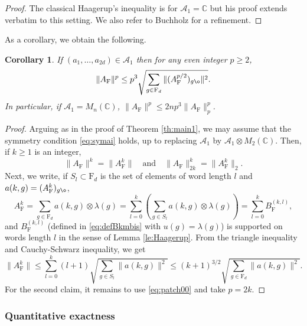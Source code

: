\documentclass[11pt]{article}
\renewcommand{\star}{{\mathrm{F}}}
\newtheorem{corollary}[lemma]{Corollary}
\newcommand{\cA}{\mathcal{A}}
\newcommand{\dF}{\mathrm{F}}
\newcommand{\dC}{\mathbb {C}}
\newcommand{\PAR}[1]{{{\left(#1\right)}}} %
\newcommand{\AND}{\quad \mathrm{and} \quad}
\newcommand{\1}{1\!\!{\sf I}}
\begin{document}
\begin{proof}The classical Haagerup's inequality \cite[Lemma 1.4]{MR520930} is for $\cA_1 = \dC$ but his proof extends verbatim to this setting. We also refer to Buchholz \cite[Theorem 2.8]{MR1476122} for a refinement.
\end{proof}

As a corollary, we obtain the following. 
\begin{corollary}\label{cor:HaagB}
If $(a_1,\ldots,a_{2d}) \in \cA_1$ then for any even integer $p \geq 2$,
$$
\| A_\star \|^p  \leq p^{3} \sqrt{\sum_{g \in \dF_d}\|(A^{p/2}_\star)_{g \o} \|^2 }. 
$$
In particular, if $\cA_1 = M_n(\dC)$, $\| A_\star \|^p  \leq 2 n p^{3} \|A_\star\|_p ^p$.
\end{corollary}

\begin{proof}
Arguing as in the proof of Theorem \ref{th:main1}, we may assume that the symmetry condition \eqref{eq:symai} holds, up to replacing $\cA_1$ by $\cA_1 \otimes M_2(\dC)$. Then, if $k \geq 1$ is an integer, 
\begin{equation}\label{eq:patch00}
\| A_\star \|^k = \| A_\star^k \| \AND \| A_\star \|_{2k}^{k} = \| A_\star^k \|_2. 
\end{equation}
Next, we write, if $S_l \subset \dF_d$ is the set of elements of word length $l$ and $a(k,g) = (A^{k}_\star)_{g \o}$,
$$
A_\star^k  = \sum_{g \in \dF_d} a(k,g)\otimes \lambda( g)   = \sum_{l=0}^k \PAR{\sum_{ g \in S_l} a(k,g)\otimes \lambda( g)}  = \sum_{l=0}^k  B_\star^{(k,l)},  
$$
and $B_\star^{(k,l)}$ (defined in \eqref{eq:defBkmbis} with $u(g) = \lambda(g)$) is supported on words length $l$ in the sense of Lemma \ref{le:Haagerup}. From the triangle inequality and Cauchy-Schwarz inequality, we get 
$$
\| A_\star^k \|  \leq \sum_{l=0}^k (l+1)  \sqrt{ \sum_{g \in S_l} \| a(k,g) \|^2  }  \leq (k+1)^{3/2}   \sqrt{\sum_{g \in \dF_d}  \| a(k,g) \|^2 }.
$$
For the second claim, it remains to use \eqref{eq:patch00} and take $p= 2k$.
\end{proof}

\subsubsection{Quantitative exactness}
\end{document}
